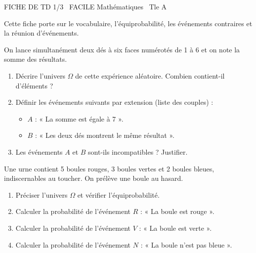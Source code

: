 \documentclass[11pt]{article}
\begin{document}
\begin{tcolorbox}[enhanced,colback=popink,colframe=popink,arc=10pt,boxrule=0pt,left=12pt,right=12pt,top=9pt,bottom=9pt]
{\color{white}\popxbold\small FICHE DE TD 1/3 \textbullet\ FACILE \hfill Mathématiques \textbullet\ Tle A\par}
\end{tcolorbox}
\vspace{4pt}
Cette fiche porte sur le vocabulaire, l'équiprobabilité, les événements contraires et la réunion d'événements.

\begin{exercice}
On lance simultanément deux dés à six faces numérotés de 1 à 6 et on note la somme des résultats.
\begin{enumerate}
    \item Décrire l'univers $\Omega$ de cette expérience aléatoire. Combien contient-il d'éléments ?
    \item Définir les événements suivants par extension (liste des couples) :
    \begin{itemize}
        \item $A$ : « La somme est égale à 7 ».
        \item $B$ : « Les deux dés montrent le même résultat ».
    \end{itemize}
    \item Les événements $A$ et $B$ sont-ils incompatibles ? Justifier.
\end{enumerate}
\end{exercice}

\begin{exercice}
Une urne contient 5 boules rouges, 3 boules vertes et 2 boules bleues, indiscernables au toucher. On prélève une boule au hasard.
\begin{enumerate}
    \item Préciser l'univers $\Omega$ et vérifier l'équiprobabilité.
    \item Calculer la probabilité de l'événement $R$ : « La boule est rouge ».
    \item Calculer la probabilité de l'événement $V$ : « La boule est verte ».
    \item Calculer la probabilité de l'événement $N$ : « La boule n'est pas bleue ».
\end{enumerate}
\end{exercice}
\end{document}
